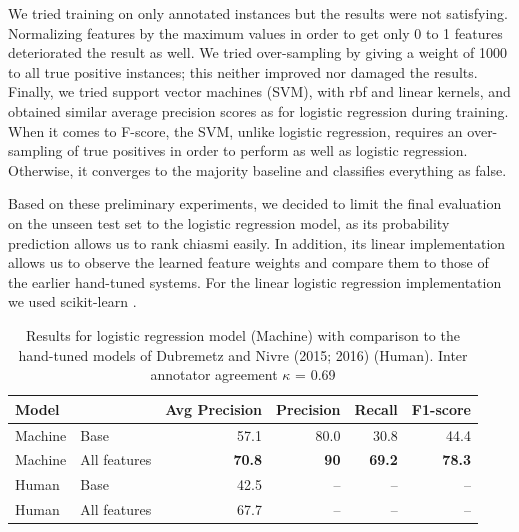 \documentclass[11pt]{article}
\begin{document}
We tried training on only annotated instances but the results were not satisfying. Normalizing features by the maximum values in order to get only 0 to 1 features deteriorated the result as well. We tried over-sampling by giving a weight of 1000 to all true positive instances; this neither improved nor damaged the results. Finally, we tried support vector machines (SVM), with rbf and linear kernels, and obtained similar average precision scores as for logistic regression during training. When it comes to F-score, the SVM, unlike logistic regression, requires an over-sampling of true positives in order to perform as well as logistic regression. Otherwise, it converges to the majority baseline and classifies everything as false. 

Based on these preliminary experiments, we decided to limit the final evaluation on the unseen test set to the logistic regression model, as its probability prediction allows us to rank chiasmi easily. In addition, its linear implementation allows us to observe the learned feature weights and compare them to those of the earlier hand-tuned systems. For the linear logistic regression implementation we used scikit-learn \cite{Pedregosa2011}.


\label{perf}
\begin{table}[t]
\begin{center}
\begin{tabular}{|ll|r|r|r|r|}
\hline 
\multicolumn{2}{|l|}{\textbf{Model}}  & \textbf{Avg Precision} &\bf Precision & \bf Recall & \bf F1-score \\
\hline 
\hline 

Machine & Base & 57.1& 80.0 & 30.8 & 44.4 \tabularnewline
\hline 
Machine & All features & \textbf{70.8}& \textbf{90} & \textbf{69.2} & \textbf{78.3} \tabularnewline
\hline 
\hline
Human & Base &42.5  & -- & -- & -- \\

\hline 
Human &All features &67.7& -- & -- & -- \tabularnewline%
\hline 

\end{tabular}

\caption{Results for logistic regression model (Machine) with comparison to the hand-tuned models of Dubremetz and Nivre (2015; 2016) (Human). Inter annotator agreement $\kappa$ = 0.69}
\label{results}
\end{center}
\end{table}
\end{document}
